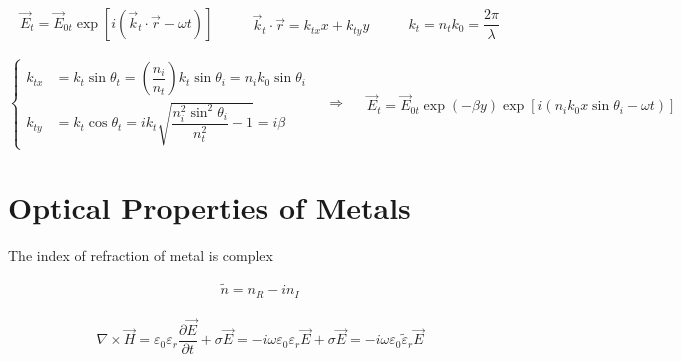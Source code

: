 \begin{equation*}
  \begin{aligned}
    \vec{E}_t = \vec{E}_{0t} \exp \left[ i \left( \vec{k}_t  \cdot \vec{r} - \omega t \right) \right]
  \end{aligned}
  \quad\quad 
  \begin{aligned}
    \vec{k}_t \cdot \vec{r} = k_{tx} x + k_{ty} y
  \end{aligned}
  \quad\quad 
  \begin{aligned}
    k_t = n_t k_0 = \dfrac{2\pi}{\lambda} 
  \end{aligned}
\end{equation*}

\begin{equation*}
  \left\{
  \begin{aligned}
    k_{tx} &= k_t \sin \theta_t = \left( \dfrac{n_i}{n_t}  \right) k_t \sin \theta_i = n_i k_0 \sin \theta_i \\
    k_{ty} &= k_t \cos \theta_t = i k_t \sqrt{\dfrac{n_i^2 \sin^2 \theta_i}{n_t^2} - 1} = i \beta
  \end{aligned}
  \right.
  \quad \Rightarrow \quad 
  \begin{aligned}
    \vec{E}_t = \vec{E}_{0t} \exp \left( - \beta y \right) \exp \left[ i \left( n_i k_0 x \sin \theta_i - \omega t \right) \right]
  \end{aligned}
\end{equation*}

\section{Optical Properties of Metals}

The index of refraction of metal is complex

\begin{equation*}
  \begin{aligned}
    \tilde{n} = n_R - i n_I
  \end{aligned}
\end{equation*}

\begin{equation*}
  \begin{aligned}
    \nabla \times \vec{H} = \varepsilon_0 \varepsilon_r \dfrac{\partial \vec{E}}{\partial t} + \sigma \vec{E} = - i \omega \varepsilon_0 \varepsilon_r \vec{E} + \sigma \vec{E} = - i \omega \varepsilon_0 \tilde{\varepsilon}_r \vec{E}
  \end{aligned}
\end{equation*}

